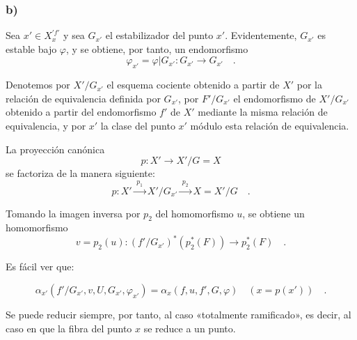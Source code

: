 \subsubsection*{b)} Sea $x'\in X_x^{\prime f'}$ y sea $G_{x'}$ el estabilizador del punto $x'$. Evidentemente, $G_{x'}$ es estable bajo $\varphi$, y se obtiene, por tanto, un endomorfismo
\[
\varphi_{x'} = \varphi|G_{x'} : G_{x'} \longrightarrow G_{x'} \quad .
\]

Denotemos por $X'/G_{x'}$ el esquema cociente obtenido a partir de $X'$ por la relación de equivalencia definida por $G_{x'}$, por $F'/G_{x'}$ el endomorfismo de $X'/G_{x'}$ obtenido a partir del endomorfismo $f'$ de $X'$ mediante la misma relación de equivalencia, y por $x'$ la clase del punto $x'$ módulo esta relación de equivalencia.%

La proyección canónica
\[
p : X' \longrightarrow X'/G = X
\]
se factoriza de la manera siguiente:
\[
p : X' \xrightarrow{\;p_1\;} X'/G_{x'} \xrightarrow{\;p_2\;} X = X'/G \quad .
\]

Tomando la imagen inversa por $p_2$ del homomorfismo $u$, se obtiene un homomorfismo
\[
v = p_2(u) : (f'/G_{x'})^*(p_2^*(F)) \longrightarrow p_2^*(F) \quad .
\]

Es fácil ver que:

\begin{equation}\tag{6.4.3}
\alpha_{x'}(f'/G_{x'}, v, U, G_{x'}, \varphi_{x'}) = \alpha_x(f,u, f', G, \varphi) \quad (x = p(x')) \quad .
\end{equation}

Se puede reducir siempre, por tanto, al caso «totalmente ramificado», es decir, al caso en que la fibra del punto $x$ se reduce a un punto.
